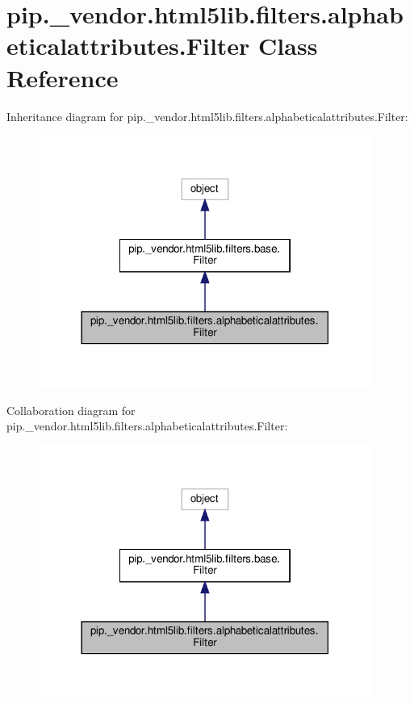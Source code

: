 \hypertarget{classpip_1_1__vendor_1_1html5lib_1_1filters_1_1alphabeticalattributes_1_1Filter}{}\section{pip.\+\_\+vendor.\+html5lib.\+filters.\+alphabeticalattributes.\+Filter Class Reference}
\label{classpip_1_1__vendor_1_1html5lib_1_1filters_1_1alphabeticalattributes_1_1Filter}


Inheritance diagram for pip.\+\_\+vendor.\+html5lib.\+filters.\+alphabeticalattributes.\+Filter\+:
\nopagebreak
\begin{figure}[H]
\begin{center}
\leavevmode
\includegraphics[width=309pt]{classpip_1_1__vendor_1_1html5lib_1_1filters_1_1alphabeticalattributes_1_1Filter__inherit__graph}
\end{center}
\end{figure}


Collaboration diagram for pip.\+\_\+vendor.\+html5lib.\+filters.\+alphabeticalattributes.\+Filter\+:
\nopagebreak
\begin{figure}[H]
\begin{center}
\leavevmode
\includegraphics[width=309pt]{classpip_1_1__vendor_1_1html5lib_1_1filters_1_1alphabeticalattributes_1_1Filter__coll__graph}
\end{center}
\end{figure}
